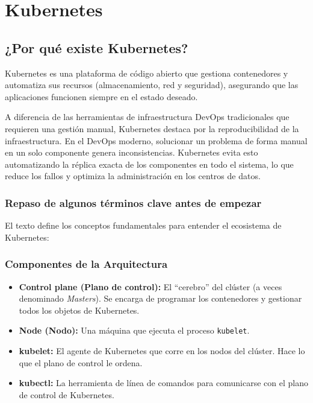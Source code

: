 \chapter{Kubernetes}
\section{¿Por qué existe Kubernetes?}
Kubernetes es una plataforma de código abierto que gestiona contenedores y automatiza sus recursos (almacenamiento, red y seguridad), asegurando que las aplicaciones funcionen siempre en el estado deseado.

A diferencia de las herramientas de infraestructura DevOps tradicionales que 
requieren una gestión manual, Kubernetes destaca por la reproducibilidad de la
 infraestructura. En el DevOps moderno, solucionar un problema de forma manual en un solo componente
  genera inconsistencias. Kubernetes evita esto automatizando la réplica exacta de los componentes en 
  todo el sistema, lo que reduce los fallos y optimiza la administración en los centros de datos.
\subsection{Repaso de algunos términos clave antes de empezar}
El texto define los conceptos fundamentales para entender el ecosistema de Kubernetes:

\subsection{Componentes de la Arquitectura}
\begin{itemize}
    \item \textbf{Control plane (Plano de control):} El ``cerebro'' del clúster (a veces denominado \textit{Masters}). Se encarga de programar los contenedores y gestionar todos los objetos de Kubernetes.
    \item \textbf{Node (Nodo):} Una máquina que ejecuta el proceso \texttt{kubelet}.
    \item \textbf{kubelet:} El agente de Kubernetes que corre en los nodos del clúster. Hace lo que el plano de control le ordena.
    \item \textbf{kubectl:} La herramienta de línea de comandos para comunicarse con el plano de control de Kubernetes.
\end{itemize}

